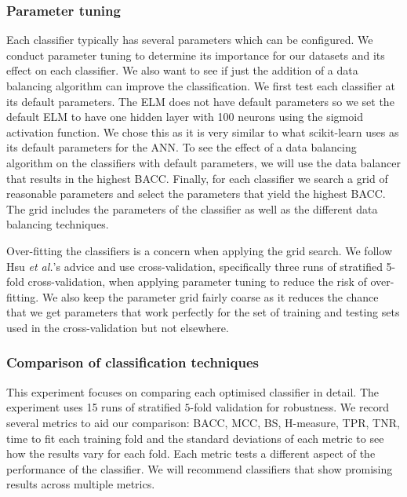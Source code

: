 \documentclass{sig-alternate-05-2015}
\begin{document}
	\subsubsection{Parameter tuning}
	\label{parameter_tuning}
	Each classifier typically has several parameters which can be configured. We conduct parameter tuning to determine its importance for our datasets and its effect on each classifier. We also want to see if just the addition of a data balancing algorithm can improve the classification. We first test each classifier at its default parameters. The ELM does not have default parameters so we set the default ELM to have one hidden layer with 100 neurons using the sigmoid activation function. We chose this as it is very similar to what scikit-learn \cite{scikit-learn} uses as its default parameters for the ANN. To see the effect of a data balancing algorithm on the classifiers with default parameters, we will use the data balancer that results in the highest BACC. Finally, for each classifier we search a grid of reasonable parameters and select the parameters that yield the highest BACC. The grid includes the parameters of the classifier as well as the different data balancing techniques.
	
	Over-fitting the classifiers is a concern when applying the grid search. We follow Hsu \textit{et al.}'s \cite{hsu2003practical} advice and use cross-validation, specifically three runs of stratified 5-fold cross-validation, when applying parameter tuning to reduce the risk of over-fitting. We also keep the parameter grid fairly coarse as it reduces the chance that we get parameters that work perfectly for the set of training and testing sets used in the cross-validation but not elsewhere.
	
	\subsubsection{Comparison of classification techniques}
	\label{comparision_of_classification_technique}
	This experiment focuses on comparing each optimised classifier in detail. The experiment uses 15 runs of stratified $5$-fold validation for robustness. We record several metrics to aid our comparison: BACC, MCC, BS, H-measure, TPR, TNR, time to fit each training fold and the standard deviations of each metric to see how the results vary for each fold. Each metric tests a different aspect of the performance of the classifier. We will recommend classifiers that show promising results across multiple metrics.
	
\end{document}
